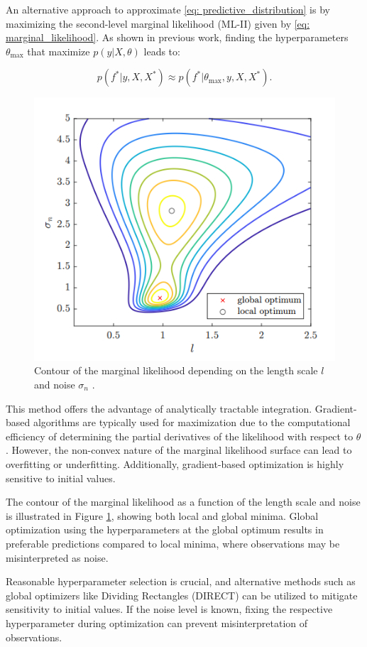An alternative approach to approximate \eqref{eq: predictive_distribution} is by maximizing the second-level marginal likelihood (ML-II) given by \eqref{eq: marginal_likelihood}. As shown in previous work, finding the hyperparameters \( \theta_{\text{max}} \) that maximize \( p(y|X,\theta) \) leads to:

\[
p(f^*|y,X,X^*) \approx p(f^*|\theta_{\text{max}},y,X,X^*).
\]


\begin{figure}
    \centering
    \includegraphics[width=0.75\linewidth]{figures/Contour_hyp.png}
    \caption{Contour of the marginal likelihood depending on the length scale \( l \) and noise \( \sigma_n \) \cite{Lubsen2022}.}
    \label{fig:opt_hyp_post}
\end{figure}

This method offers the advantage of analytically tractable integration. Gradient-based algorithms are typically used for maximization due to the computational efficiency of determining the partial derivatives of the likelihood with respect to \( \theta \). However, the non-convex nature of the marginal likelihood surface can lead to overfitting or underfitting. Additionally, gradient-based optimization is highly sensitive to initial values.

The contour of the marginal likelihood as a function of the length scale and noise is illustrated in Figure \ref{fig:opt_hyp_post}, showing both local and global minima. Global optimization using the hyperparameters at the global optimum results in preferable predictions compared to local minima, where observations may be misinterpreted as noise.

Reasonable hyperparameter selection is crucial, and alternative methods such as global optimizers like Dividing Rectangles (DIRECT) can be utilized to mitigate sensitivity to initial values. If the noise level is known, fixing the respective hyperparameter during optimization can prevent misinterpretation of observations.



